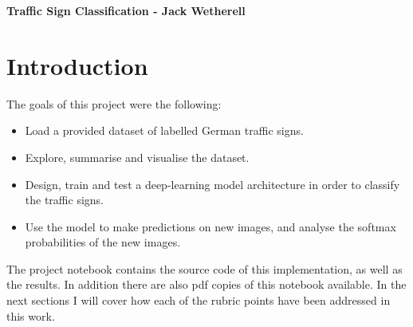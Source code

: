 \documentclass[letterpaper,12pt]{article}
\begin{document}
\title{}
\author{}
\date{}


\begin{center}
\textbf{Traffic Sign Classification - Jack Wetherell} \\
\end{center}


\section{Introduction}
The goals of this project were the following:
\begin{itemize}
\item Load a provided dataset of labelled German traffic signs.
\item Explore, summarise  and visualise the dataset.
\item Design, train and test a deep-learning model architecture in order to classify the traffic signs.
\item Use the model to make predictions on new images, and  analyse the softmax probabilities of the new images.
\end{itemize}
The project notebook contains the source code of this implementation, as well as the results. In addition there are also pdf copies of this notebook available. 
In the next sections I will cover how each of the rubric points have been addressed in this work.
\end{document}
